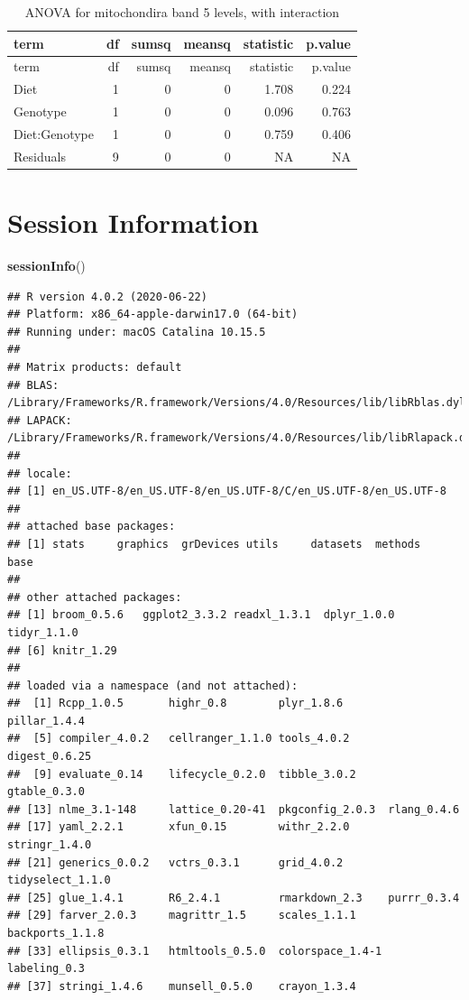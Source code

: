 \documentclass[
]{article}
\newenvironment{Shaded}{\begin{snugshade}}{\end{snugshade}}
\newcommand{\KeywordTok}[1]{\textcolor[rgb]{0.13,0.29,0.53}{\textbf{#1}}}
\newcommand{\NormalTok}[1]{#1}
\begin{document}
\begin{longtable}[]{@{}lrrrrr@{}}
\caption{ANOVA for mitochondira band 5 levels, with
interaction}\tabularnewline
\toprule
term & df & sumsq & meansq & statistic & p.value\tabularnewline
\midrule
\endfirsthead
\toprule
term & df & sumsq & meansq & statistic & p.value\tabularnewline
\midrule
\endhead
Diet & 1 & 0 & 0 & 1.708 & 0.224\tabularnewline
Genotype & 1 & 0 & 0 & 0.096 & 0.763\tabularnewline
Diet:Genotype & 1 & 0 & 0 & 0.759 & 0.406\tabularnewline
Residuals & 9 & 0 & 0 & NA & NA\tabularnewline
\bottomrule
\end{longtable}

\hypertarget{session-information}{%
\section{Session Information}\label{session-information}}

\begin{Shaded}
\begin{Highlighting}[]
\KeywordTok{sessionInfo}\NormalTok{()}
\end{Highlighting}
\end{Shaded}

\begin{verbatim}
## R version 4.0.2 (2020-06-22)
## Platform: x86_64-apple-darwin17.0 (64-bit)
## Running under: macOS Catalina 10.15.5
## 
## Matrix products: default
## BLAS:   /Library/Frameworks/R.framework/Versions/4.0/Resources/lib/libRblas.dylib
## LAPACK: /Library/Frameworks/R.framework/Versions/4.0/Resources/lib/libRlapack.dylib
## 
## locale:
## [1] en_US.UTF-8/en_US.UTF-8/en_US.UTF-8/C/en_US.UTF-8/en_US.UTF-8
## 
## attached base packages:
## [1] stats     graphics  grDevices utils     datasets  methods   base     
## 
## other attached packages:
## [1] broom_0.5.6   ggplot2_3.3.2 readxl_1.3.1  dplyr_1.0.0   tidyr_1.1.0  
## [6] knitr_1.29   
## 
## loaded via a namespace (and not attached):
##  [1] Rcpp_1.0.5       highr_0.8        plyr_1.8.6       pillar_1.4.4    
##  [5] compiler_4.0.2   cellranger_1.1.0 tools_4.0.2      digest_0.6.25   
##  [9] evaluate_0.14    lifecycle_0.2.0  tibble_3.0.2     gtable_0.3.0    
## [13] nlme_3.1-148     lattice_0.20-41  pkgconfig_2.0.3  rlang_0.4.6     
## [17] yaml_2.2.1       xfun_0.15        withr_2.2.0      stringr_1.4.0   
## [21] generics_0.0.2   vctrs_0.3.1      grid_4.0.2       tidyselect_1.1.0
## [25] glue_1.4.1       R6_2.4.1         rmarkdown_2.3    purrr_0.3.4     
## [29] farver_2.0.3     magrittr_1.5     scales_1.1.1     backports_1.1.8 
## [33] ellipsis_0.3.1   htmltools_0.5.0  colorspace_1.4-1 labeling_0.3    
## [37] stringi_1.4.6    munsell_0.5.0    crayon_1.3.4
\end{verbatim}
\end{document}
